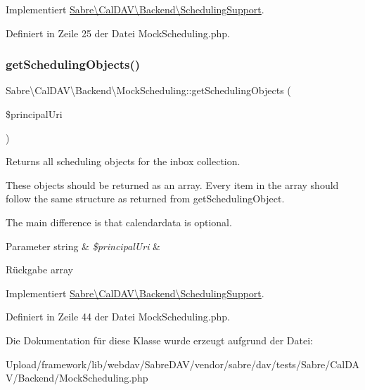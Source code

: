 Implementiert \mbox{\hyperlink{interface_sabre_1_1_cal_d_a_v_1_1_backend_1_1_scheduling_support_a01af6a746c7ed902a83c7eda56226519}{Sabre\textbackslash{}\+Cal\+D\+A\+V\textbackslash{}\+Backend\textbackslash{}\+Scheduling\+Support}}.



Definiert in Zeile 25 der Datei Mock\+Scheduling.\+php.

\mbox{\label{class_sabre_1_1_cal_d_a_v_1_1_backend_1_1_mock_scheduling_a3c4759a7ce8f76a5dc15319cf15c5031}} 
\subsubsection{\texorpdfstring{get\+Scheduling\+Objects()}{getSchedulingObjects()}}
{\footnotesize\ttfamily Sabre\textbackslash{}\+Cal\+D\+A\+V\textbackslash{}\+Backend\textbackslash{}\+Mock\+Scheduling\+::get\+Scheduling\+Objects (\begin{DoxyParamCaption}\item[{}]{\$principal\+Uri }\end{DoxyParamCaption})}

Returns all scheduling objects for the inbox collection.

These objects should be returned as an array. Every item in the array should follow the same structure as returned from get\+Scheduling\+Object.

The main difference is that \textquotesingle{}calendardata\textquotesingle{} is optional.


\begin{DoxyParams}[1]{Parameter}
string & {\em \$principal\+Uri} & \\
\hline
\end{DoxyParams}
\begin{DoxyReturn}{Rückgabe}
array 
\end{DoxyReturn}


Implementiert \mbox{\hyperlink{interface_sabre_1_1_cal_d_a_v_1_1_backend_1_1_scheduling_support_afdf40c6b8b703d1b2ffccb74106b4457}{Sabre\textbackslash{}\+Cal\+D\+A\+V\textbackslash{}\+Backend\textbackslash{}\+Scheduling\+Support}}.



Definiert in Zeile 44 der Datei Mock\+Scheduling.\+php.



Die Dokumentation für diese Klasse wurde erzeugt aufgrund der Datei\+:\begin{DoxyCompactItemize}
\item 
Upload/framework/lib/webdav/\+Sabre\+D\+A\+V/vendor/sabre/dav/tests/\+Sabre/\+Cal\+D\+A\+V/\+Backend/Mock\+Scheduling.\+php\end{DoxyCompactItemize}
